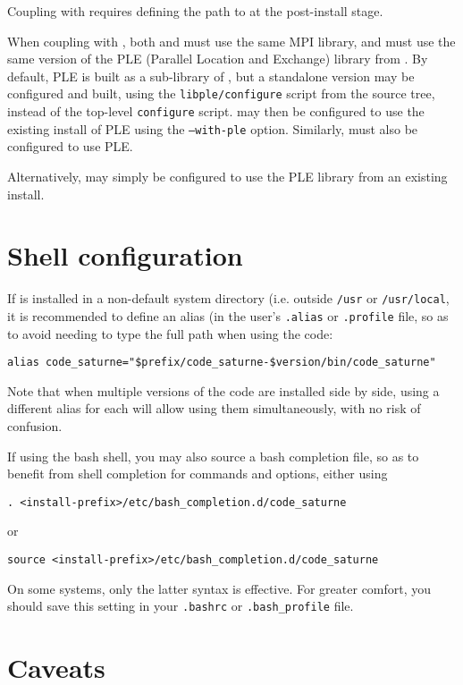 \documentclass[a4paper,10pt,twoside]{csshortdoc}
\begin{document}
Coupling with  requires defining the path to 
at the post-install stage.

When coupling with , both \CS and \syrthes must
use the same MPI library, and must use the same version of the
PLE (Parallel Location and Exchange) library from \CS. By default, PLE
is built as a sub-library of \CS, but a standalone version may be
configured and built, using the \texttt{libple/configure} script
from the \CS source tree, instead of the top-level \texttt{configure}
script. \CS may then be configured to use the existing install of PLE
using the \texttt{--with-ple} option. Similarly, \syrthes must also
be configured to use PLE.

Alternatively,  may simply be configured to use the PLE
library from an existing \CS install.

\section{Shell configuration}

If \CS is installed in a non-default system directory (i.e. outside
\texttt{/usr} or \texttt{/usr/local}, it is recommended to define
an alias (in the user's \texttt{.alias} or \texttt{.profile} file, so as to
avoid needing to type the full path when using the code:

\texttt{alias code\_saturne="\$prefix/code\_saturne-\$version/bin/code\_saturne"}

Note that when multiple versions of the code are installed side by side, using
a different alias for each will allow using them simultaneously, with no risk
of confusion.

If using the bash shell, you may also source a bash completion file,
so as to benefit from shell completion for \CS commands
and options, either using

\texttt{. <install-prefix>/etc/bash\_completion.d/code\_saturne}

or

\texttt{source <install-prefix>/etc/bash\_completion.d/code\_saturne}

On some systems, only the latter syntax is effective. For greater
comfort, you should save this setting in your \texttt{.bashrc}
or \texttt{.bash\_profile} file.

\section{Caveats}
\end{document}
